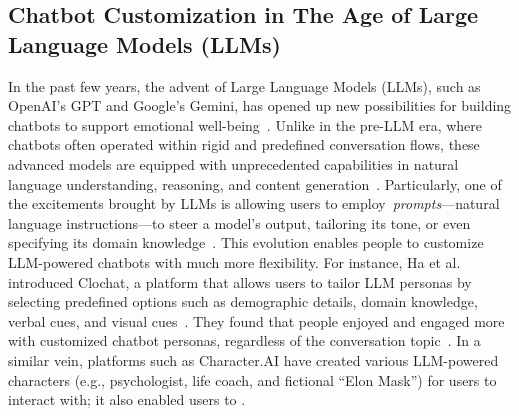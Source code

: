 \vspace{-1.5mm}
\subsection{Chatbot Customization in The Age of Large Language Models (LLMs)}

In the past few years, the advent of Large Language Models (LLMs), such as OpenAI's GPT and Google's Gemini, has opened up new possibilities for building chatbots to support emotional well-being~\cite{chiang2024chatbot, jo2023understanding, Sharma2024Restructuring}.
Unlike in the pre-LLM era, where chatbots often operated within rigid and predefined conversation flows, these advanced models are equipped with unprecedented capabilities in natural language understanding, reasoning, and content generation~\cite{chiang2024chatbot, jo2023understanding, Sharma2024Restructuring}. 
Particularly, one of the excitements brought by LLMs is allowing users to employ~\textit{prompts}---natural language instructions---to steer a model's output, tailoring its tone, or even specifying its domain knowledge~\cite{pengfei_2023_prompt, Ha2024Clochat, zamfirescu2023herding, zamfirescu2023johnny, characterai}. This evolution enables people to customize LLM-powered chatbots with much more flexibility.
For instance, Ha et al. introduced Clochat, a platform that allows users to tailor LLM personas by selecting predefined options such as demographic details, domain knowledge, verbal cues, and visual cues~\cite{Ha2024Clochat}. They found that people enjoyed and engaged more with customized chatbot personas, regardless of the conversation topic~\cite{Ha2024Clochat}.
In a similar vein, platforms such as Character.AI have created various LLM-powered characters (e.g., psychologist, life coach, and fictional ``Elon Mask'') for users to interact with; it also enabled users to .

